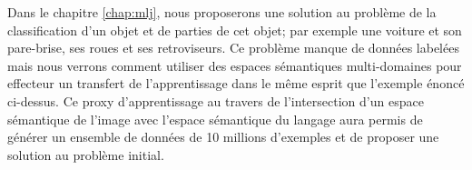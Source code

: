 Dans le chapitre \ref{chap:mlj}, nous proposerons une solution au problème de
la classification d'un objet et de parties de cet objet; par exemple une
voiture et son pare-brise, ses roues et ses retroviseurs. Ce problème manque de
données labelées mais nous verrons comment utiliser des espaces sémantiques
multi-domaines pour effecteur un transfert de l'apprentissage dans le même
esprit que l'exemple énoncé ci-dessus. Ce proxy d'apprentissage au travers de
l'intersection d'un espace sémantique de l'image avec l'espace sémantique du
langage aura permis de générer un ensemble de données de 10 millions d'exemples
et de proposer une solution au problème initial.


